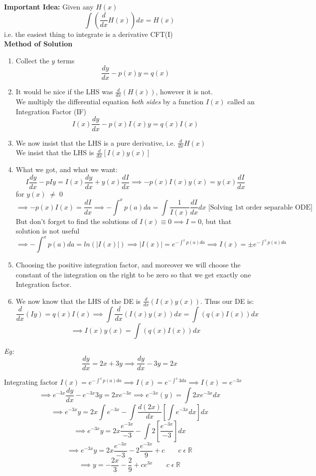 \documentclass[11pt]{article}
\theoremstyle{definition}
\newcommand{\R}{\mathbb{R}}
\begin{document}
\textbf{Important Idea:} Given any $H(x)$
$$\int (\frac{d}{dx}H(x)) dx = H(x)$$
i.e. the easiest thing to integrate is a derivative CFT(I)\\

\textbf{Method of Solution}
\begin{enumerate}
    \item Collect the $y$ terms
    $$\frac{dy}{dx} - p(x)y = q(x)$$
    \item It would be nice if the LHS was $\frac{d}{dx}(H(x))$, however it is not.\\
    We multiply the differential equation \textit{both sides} by a function $I(x)$ called an Integration Factor (IF)
        $$I(x)\frac{dy}{dx} - p(x)I(x)y = q(x)I(x)$$
    \item We now insist that the LHS is a pure derivative, i.e. $\frac{d}{dx}H(x)$\\
    We insist that the LHS is $\frac{d}{dx}[I(x)y(x)]$
    \item What we got, and what we want:
    $$I\frac{dy}{dx} - pIy = I(x)\frac{dy}{dx} + y(x)\frac{dI}{dx} \implies -p(x)I(x)y(x) = y(x)\frac{dI}{dx}$$
    for $y(x)\; \neq\; 0$
    $$\implies -p(x)I(x) = \frac{dI}{dx} \implies -\int^x p(a) da = \int \frac{1}{I(x)} \frac{dI}{dx}dx \mbox{ [Solving 1st order separable ODE]}$$ 
    But don't forget to find the solutions of $I(x) \equiv 0 \implies I = 0$, but that solution is not useful
    $$\implies -\int^x p(a) da = ln(|I(x)|) \implies |I(x)| = e^{-\int^x p(a) da} \implies I(x) = \pm e^{-\int^x p(a) da}$$
    \item Choosing the positive integration factor, and moreover we will choose the constant of the integration on the right to be zero so that we get exactly one Integration factor.
    \item We now know that the LHS of the DE is $\frac{d}{dx}(I(x)y(x))$. Thus our DE is:
    $$\frac{d}{dx}(Iy) = q(x)I(x) \implies \int \frac{d}{dx}(I(x)y(x))dx = \int(q(x)I(x))dx$$ $$\implies I(x)y(x) = \int(q(x)I(x))dx$$
\end{enumerate}

\textit{Eg:} $$\frac{dy}{dx} = 2x + 3y \implies \frac{dy}{dx} - 3y = 2x$$

Integrating factor $I(x) = e^{-\int^x p(a)da} \implies I(x) = e^{-\int^x 3da} \implies I(x) = e^{-3x}$
$$\implies e^{-3x}\frac{dy}{dx} - e^{-3x}3y = 2xe^{-3x} \implies e^{-3x}(y) = \int2xe^{-3x}dx$$
$$\implies e^{-3x}y = 2x\int e^{-3x} - \int \frac{d(2x)}{dx}[\int e^{-3x} dx] dx$$
$$\implies e^{-3x}y = 2x\frac{e^{-3x}}{-3} - \int 2[\frac{e^{-3x}}{-3}] dx$$
$$\implies e^{-3x}y = 2x\frac{e^{-3x}}{-3} - 2\frac{e^{-3x}}{9} + c \;\;\;\;\;\;\; c\; \epsilon\; \R$$
$$\implies y = -\frac{2x}{3} - \frac{2}{9} + ce^{3x} \;\;\;\;\;\;\; c\; \epsilon\; \R$$
\end{document}
